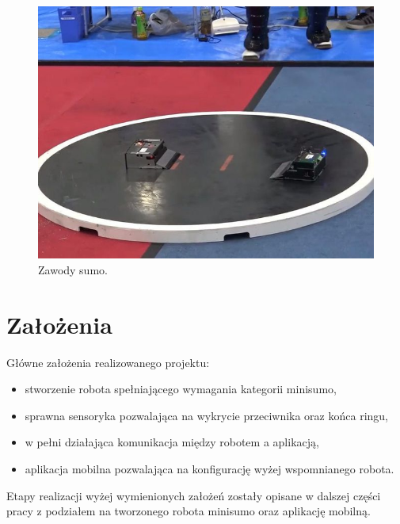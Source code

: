 \begin{figure}[H]
	\centering
		\includegraphics[width=0.75\linewidth]{pic01/sumo_competitions.jpg}
	\caption{Zawody sumo.}
	\label{fig:sumo_competitions}	
\end{figure}

\section{Założenia}
Główne założenia realizowanego projektu:
\begin{itemize}
\item stworzenie robota spełniającego wymagania kategorii minisumo,
\item sprawna sensoryka pozwalająca na wykrycie przeciwnika oraz końca ringu,
\item w pełni działająca komunikacja między robotem a aplikacją,
\item aplikacja mobilna pozwalająca na konfigurację wyżej wspomnianego robota.
\end{itemize}

Etapy realizacji wyżej wymienionych założeń zostały opisane w dalszej części pracy z podziałem na tworzonego robota minisumo oraz aplikację mobilną.
